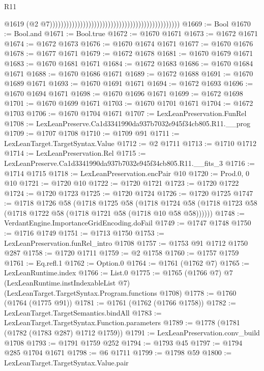 \begin{lexlean}{R11}
\begin{coremodule}
                                                                                                @1619
                                                                                                (@2
                                                                                                  @7)))))))))))))))))))))))))))))))))))))))))))))))
@1669 := Bool
@1670 := Bool.and
@1671 := Bool.true
@1672 := @1670 @1671
@1673 := @1672 @1671
@1674 := @1672 @1673
@1676 := @1670 @1674 @1671
@1677 := @1670 @1676
@1678 := @1677 @1671
@1679 := @1672 @1678
@1681 := @1670 @1679 @1671
@1683 := @1670 @1681 @1671
@1684 := @1672 @1683
@1686 := @1670 @1684 @1671
@1688 := @1670 @1686 @1671
@1689 := @1672 @1688
@1691 := @1670 @1689 @1671
@1693 := @1670 @1691 @1671
@1694 := @1672 @1693
@1696 := @1670 @1694 @1671
@1698 := @1670 @1696 @1671
@1699 := @1672 @1698
@1701 := @1670 @1699 @1671
@1703 := @1670 @1701 @1671
@1704 := @1672 @1703
@1706 := @1670 @1704 @1671
@1707 := LexLeanPreservation.FunRel
@1708 := LexLeanPreserve.Ca1d3341990da937b7032e945f34cb805.R11.__prog
@1709 := @1707 @1708
@1710 := @1709 @91
@1711 := LexLeanTarget.TargetSyntax.Value
@1712 := @2 @1711
@1713 := @1710 @1712
@1714 := LexLeanPreservation.Rel
@1715 := LexLeanPreserve.Ca1d3341990da937b7032e945f34cb805.R11.__fits_3
@1716 := @1714 @1715
@1718 := LexLeanPreservation.encPair @10
@1720 := Prod.{0, 0} @10
@1721 := @1720 @10
@1722 := @1720 @1721
@1723 := @1720 @1722
@1724 := @1720 @1723
@1725 := @1720 @1724
@1726 := @1720 @1725
@1747 := @1718
    @1726
    @58
    (@1718
      @1725
      @58
      (@1718 @1724 @58 (@1718 @1723 @58 (@1718 @1722 @58 (@1718 @1721 @58 (@1718 @10 @58 @58))))))
@1748 := VerdantEngine.ImportanceGridEncoding.doFail
@1749 := @1747 @1748
@1750 := @1716 @1749
@1751 := @1713 @1750
@1753 := LexLeanPreservation.funRel_intro @1708
@1757 := @1753 @91 @1712 @1750 @287
@1758 := @1720 @1711
@1759 := @2 @1758
@1760 := @1757 @1759
@1761 := Eq.refl.{1}
@1762 := Option.{0}
@1764 := @1761 (@1762 @7)
@1765 := LexLeanRuntime.index
@1766 := List.{0}
@1775 := @1765
    (@1766 @7)
    @7
    (LexLeanRuntime.instIndexableList @7)
    (LexLeanTarget.TargetSyntax.Program.functions @1708)
@1778 := @1760 (@1764 (@1775 @91))
@1781 := @1761 (@1762 (@1766 @1758))
@1782 := LexLeanTarget.TargetSemantics.bindAll
@1783 := LexLeanTarget.TargetSyntax.Function.parameters
@1789 := @1778 (@1781 (@1782 (@1783 @287) @1712 @1759))
@1791 := LexLeanPreservation.conv_build @1708
@1793 := @1791 @1759 @252
@1794 := @1793 @45
@1797 := @1794 @285 @1704 @1671
@1798 := @6 @1711
@1799 := @1798 @59
@1800 := LexLeanTarget.TargetSyntax.Value.pair

\end{coremodule}
\end{lexlean}
